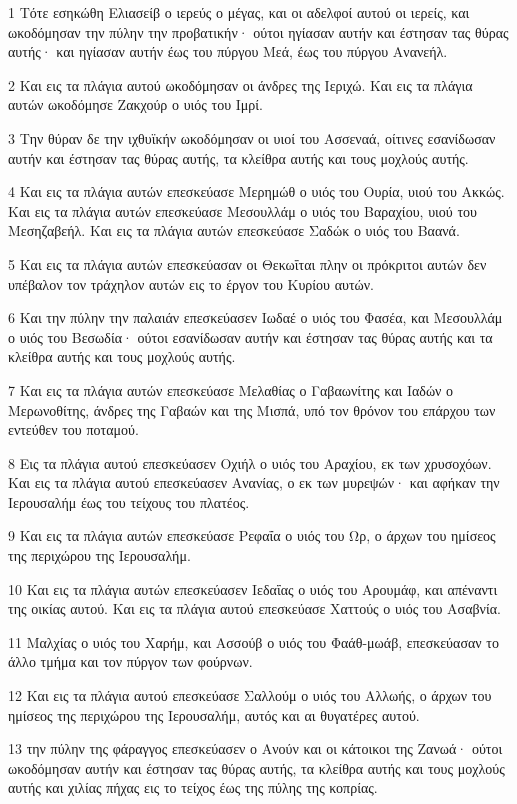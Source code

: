 \par 1 Τότε εσηκώθη Ελιασείβ ο ιερεύς ο μέγας, και οι αδελφοί αυτού οι ιερείς, και ωκοδόμησαν την πύλην την προβατικήν· ούτοι ηγίασαν αυτήν και έστησαν τας θύρας αυτής· και ηγίασαν αυτήν έως του πύργου Μεά, έως του πύργου Ανανεήλ.
\par 2 Και εις τα πλάγια αυτού ωκοδόμησαν οι άνδρες της Ιεριχώ. Και εις τα πλάγια αυτών ωκοδόμησε Ζακχούρ ο υιός του Ιμρί.
\par 3 Την θύραν δε την ιχθυϊκήν ωκοδόμησαν οι υιοί του Ασσεναά, οίτινες εσανίδωσαν αυτήν και έστησαν τας θύρας αυτής, τα κλείθρα αυτής και τους μοχλούς αυτής.
\par 4 Και εις τα πλάγια αυτών επεσκεύασε Μερημώθ ο υιός του Ουρία, υιού του Ακκώς. Και εις τα πλάγια αυτών επεσκεύασε Μεσουλλάμ ο υιός του Βαραχίου, υιού του Μεσηζαβεήλ. Και εις τα πλάγια αυτών επεσκεύασε Σαδώκ ο υιός του Βαανά.
\par 5 Και εις τα πλάγια αυτών επεσκεύασαν οι Θεκωΐται πλην οι πρόκριτοι αυτών δεν υπέβαλον τον τράχηλον αυτών εις το έργον του Κυρίου αυτών.
\par 6 Και την πύλην την παλαιάν επεσκεύασεν Ιωδαέ ο υιός του Φασέα, και Μεσουλλάμ ο υιός του Βεσωδία· ούτοι εσανίδωσαν αυτήν και έστησαν τας θύρας αυτής και τα κλείθρα αυτής και τους μοχλούς αυτής.
\par 7 Και εις τα πλάγια αυτών επεσκεύασε Μελαθίας ο Γαβαωνίτης και Ιαδών ο Μερωνοθίτης, άνδρες της Γαβαών και της Μισπά, υπό τον θρόνον του επάρχου των εντεύθεν του ποταμού.
\par 8 Εις τα πλάγια αυτού επεσκεύασεν Οχιήλ ο υιός του Αραχίου, εκ των χρυσοχόων. Και εις τα πλάγια αυτού επεσκεύασεν Ανανίας, ο εκ των μυρεψών· και αφήκαν την Ιερουσαλήμ έως του τείχους του πλατέος.
\par 9 Και εις τα πλάγια αυτών επεσκεύασε Ρεφαΐα ο υιός του Ωρ, ο άρχων του ημίσεος της περιχώρου της Ιερουσαλήμ.
\par 10 Και εις τα πλάγια αυτών επεσκεύασεν Ιεδαΐας ο υιός του Αρουμάφ, και απέναντι της οικίας αυτού. Και εις τα πλάγια αυτού επεσκεύασε Χαττούς ο υιός του Ασαβνία.
\par 11 Μαλχίας ο υιός του Χαρήμ, και Ασσούβ ο υιός του Φαάθ-μωάβ, επεσκεύασαν το άλλο τμήμα και τον πύργον των φούρνων.
\par 12 Και εις τα πλάγια αυτού επεσκεύασε Σαλλούμ ο υιός του Αλλωής, ο άρχων του ημίσεος της περιχώρου της Ιερουσαλήμ, αυτός και αι θυγατέρες αυτού.
\par 13 την πύλην της φάραγγος επεσκεύασεν ο Ανούν και οι κάτοικοι της Ζανωά· ούτοι ωκοδόμησαν αυτήν και έστησαν τας θύρας αυτής, τα κλείθρα αυτής και τους μοχλούς αυτής και χιλίας πήχας εις το τείχος έως της πύλης της κοπρίας.
